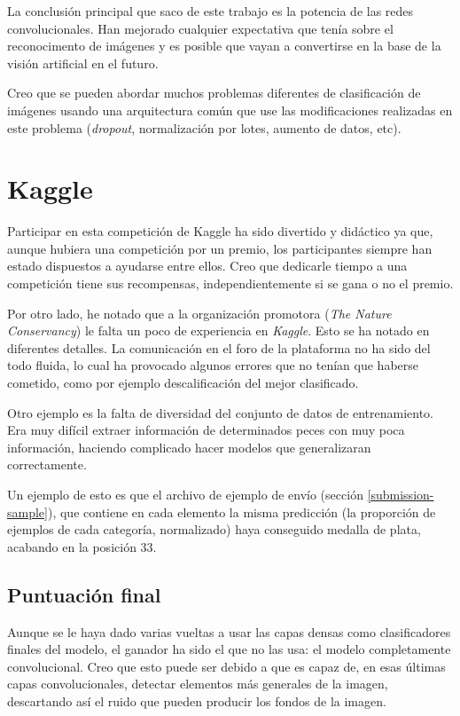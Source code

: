 La conclusión principal que saco de este trabajo es la potencia de las redes
convolucionales. Han mejorado cualquier expectativa que tenía sobre el reconocimento
de imágenes y es posible que vayan a convertirse en la base de la visión artificial
en el futuro.

Creo que se pueden abordar muchos problemas diferentes de clasificación de
imágenes usando una arquitectura común que use las modificaciones
realizadas en este problema (\textit{dropout}, normalización por lotes, aumento
de datos, etc).

\section{Kaggle}

Participar en esta competición de Kaggle ha sido divertido y didáctico ya que,
aunque hubiera una competición por un premio, los participantes siempre han
estado dispuestos a ayudarse entre ellos. Creo que dedicarle tiempo a una
competición tiene sus recompensas, independientemente si se gana o no el premio.

Por otro lado, he notado que a la organización promotora (\textit{The Nature
Conservancy}) le falta un poco de experiencia en \textit{Kaggle}. Esto se ha
notado en diferentes detalles. La comunicación en el foro de la plataforma no
ha sido del todo fluida, lo cual ha provocado algunos errores que no tenían que
haberse cometido, como por ejemplo descalificación del mejor clasificado.

Otro ejemplo es la falta de diversidad del conjunto de datos de entrenamiento.
Era muy difícil extraer información de determinados peces con muy poca información,
haciendo complicado hacer modelos que generalizaran correctamente.

Un ejemplo de esto es que el archivo de ejemplo de envío (sección
\ref{submission-sample}), que contiene en cada elemento la misma predicción (la
proporción de ejemplos de cada categoría, normalizado) haya conseguido medalla
de plata, acabando en la posición 33.

\subsection{Puntuación final}

Aunque se le haya dado varias vueltas a usar las capas densas como
clasificadores finales del modelo, el ganador ha sido el que no las usa: el
modelo completamente convolucional. Creo que esto puede ser debido a que es
capaz de, en esas últimas capas convolucionales, detectar elementos más
generales de la imagen, descartando así el ruido que pueden producir los fondos
de la imagen.

